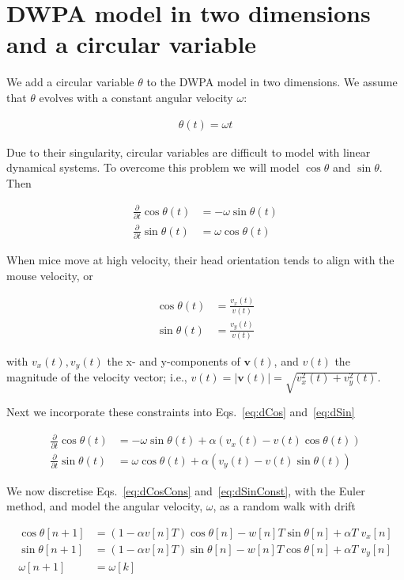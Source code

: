 \documentclass[fleqn,12pt]{article}
\begin{document}
\section{DWPA model in two dimensions and a circular variable}

We add a circular variable $\theta$ to the DWPA model in two dimensions. We
assume that $\theta$ evolves with a constant angular velocity $\omega$:

\begin{align*}
    \theta(t)=\omega t
\end{align*}

Due to their singularity, circular variables are difficult to model with linear
dynamical systems. To overcome this problem we will model $\cos\theta$ and
$\sin\theta$. Then

\begin{align}
    \frac{\partial}{\partial
    t}\cos\theta(t)&=-\omega\sin\theta(t)\label{eq:dCos}\\
    \frac{\partial}{\partial t}\sin\theta(t)&=\omega\cos\theta(t)\label{eq:dSin}
\end{align}

When mice move at high velocity, their head orientation tends to align with the
mouse velocity, or

\begin{align*}
    \cos\theta(t)&=\frac{v_x(t)}{v(t)}\\
    \sin\theta(t)&=\frac{v_y(t)}{v(t)}
\end{align*}

\noindent with $v_x(t), v_y(t)$ the x- and y-components of $\mathbf{v}(t)$, and
$v(t)$ the magnitude of the velocity vector; i.e.,
$v(t)=|\mathbf{v}(t)|=\sqrt{v_x^2(t)+v_y^2(t)}$.

Next we incorporate these constraints into Eqs.~\ref{eq:dCos} and~\ref{eq:dSin}

\begin{align}
    \frac{\partial}{\partial t}\cos\theta(t)&=-\omega\sin\theta(t)+\alpha\left(v_x(t)-v(t)\cos\theta(t)\right)\label{eq:dCosCons}\\
    \frac{\partial}{\partial t}\sin\theta(t)&=\omega\cos\theta(t)+\alpha\left(v_y(t)-v(t)\sin\theta(t)\right)\label{eq:dSinConst}
\end{align}

We now discretise Eqs.~\ref{eq:dCosCons} and~\ref{eq:dSinConst}, with the
Euler method, and model the angular velocity, $\omega$, as a random walk with
drift

\begin{align}
    \cos\theta[n+1]&=\left(1-\alpha v[n]T\right)\cos\theta[n]-w[n]T\sin\theta[n]+\alpha T\;v_x[n]\\
    \sin\theta[n+1]&=\left(1-\alpha v[n]T\right)\sin\theta[n]-w[n]T\cos\theta[n]+\alpha T\;v_y[n]\\
    \omega[n+1]&=\omega[k]
\end{align}
\end{document}
